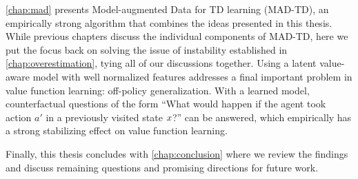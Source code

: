 \autoref{chap:mad} presents Model-augmented Data for TD learning (MAD-TD), an empirically strong algorithm that combines the ideas presented in this thesis.
While previous chapters discuss the individual components of MAD-TD, here we put the focus back on solving the issue of instability established in \autoref{chap:overestimation}, tying all of our discussions together.
Using a latent value-aware model with well normalized features addresses a final important problem in value function learning: off-policy generalization.
With a learned model, counterfactual questions of the form ``What would happen if the agent took action $a'$ in a previously visited state $x$?'' can be answered, which empirically has a strong stabilizing effect on value function learning.

Finally, this thesis concludes with \autoref{chap:conclusion} where we review the findings and discuss remaining questions and promising directions for future work.


